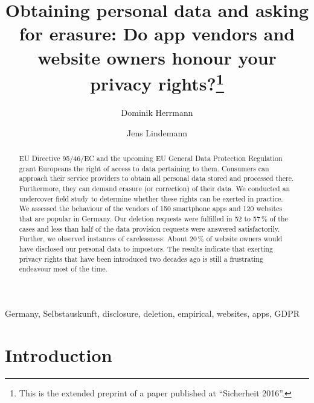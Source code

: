 \documentclass{llncs}
\begin{document}
\author{Dominik Herrmann \and Jens Lindemann}

\title{Obtaining personal data and asking for erasure: Do app vendors and website owners honour your privacy rights?\thanks{This is the extended preprint of a paper published at ``Sicherheit 2016''.}}



\maketitle

\begin{abstract}
EU Directive 95/46/EC and the upcoming EU General Data Protection Regulation grant Europeans the right of access to data pertaining to them. Consumers can approach their service providers to obtain all personal data stored and processed there. Furthermore, they can demand erasure (or correction) of their data. We conducted an undercover field study to determine whether these rights can be exerted in practice. We assessed the behaviour of the vendors of 150 smartphone apps and 120 websites that are popular in Germany. Our deletion requests were fulfilled in 52 to 57\,\% of the cases and less than half of the data provision requests were answered satisfactorily. Further, we observed instances of carelessness: About 20\,\% of website owners would have disclosed our personal data to impostors. The results indicate that exerting privacy rights that have been introduced two decades ago is still a frustrating endeavour most of the time.
\end{abstract}

\begin{keywords}
Germany, Selbstauskunft, disclosure, deletion, empirical, websites, apps, GDPR
\end{keywords}




\section{Introduction}
\end{document}
